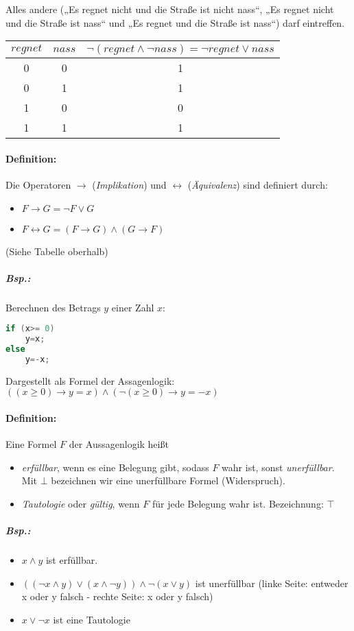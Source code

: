 \documentclass{scrreprt}
\begin{document}
Alles andere („Es regnet nicht und die Straße ist nicht nass“, „Es regnet nicht und die Straße ist nass“ und „Es regnet und die Straße ist nass“) darf eintreffen.\\
\begin{tabular}{c c | c}
$regnet$ & $nass$ & $\neg (regnet \wedge \neg nass) = \neg regnet \vee nass$\\
\hline
0&0&1\\
0&1&1\\
1&0&0\\
1&1&1\\
\end{tabular}

\paragraph{Definition:} Die Operatoren $\rightarrow$ (\emph{Implikation}) und $\leftrightarrow$ (\emph{Äquivalenz}) sind definiert durch:
\begin{itemize}
\item $F\rightarrow G = \neg F \vee G$
\item $F\leftrightarrow G = (F \rightarrow G) \wedge (G \rightarrow F)$
\end{itemize}
(Siehe Tabelle oberhalb)

\subparagraph{Bsp.:} Berechnen des Betrags $y$ einer Zahl $x$:
\begin{lstlisting}[language=C]
if (x>= 0)
	y=x;
else 
	y=-x;
\end{lstlisting}
Dargestellt als Formel der Assagenlogik: $((x\geq 0) \rightarrow y=x)\wedge(\neg (x\geq 0) \rightarrow y=-x)$

\paragraph{Definition:} Eine Formel $F$ der Aussagenlogik heißt
\begin{itemize}

\item \emph{erfüllbar}, wenn es eine Belegung gibt, sodass $F$ wahr ist, sonst \emph{unerfüllbar}. Mit $\bot$ bezeichnen wir eine unerfüllbare Formel (Widerspruch).
\item \emph{Tautologie} oder \emph{gültig}, wenn $F$ für jede Belegung wahr ist. Bezeichnung: $\top$
\end{itemize}

\subparagraph{Bsp.:}
\begin{itemize}
\item $x\wedge y$ ist erfüllbar.
\item $((\neg x \wedge y)\vee (x\wedge \neg y)) \wedge \neg (x\vee y)$ ist unerfüllbar (linke Seite: entweder x oder y falsch - rechte Seite: x oder y falsch)
\item $x \vee \neg x$ ist eine Tautologie
\end{itemize}
\end{document}
